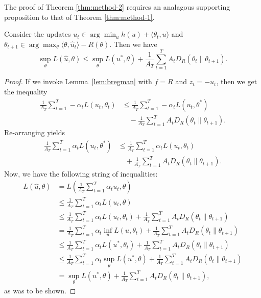 \documentclass{article} %
\begin{document}
The proof of Theorem \ref{thm:method-2} requires an analagous supporting proposition to that of Theorem \ref{thm:method-1}.
\begin{proposition}
\label{prop:method-2}
Consider the updates $u_t \in \arg\min_{u} h(u) + \langle \theta_t, u \rangle$ 
and $\theta_{t+1} \in \arg\max_{\theta} \langle \theta, \hat{u}_t \rangle - R(\theta)$. 
Then we have 
\begin{equation}
\sup_{\theta} L(\hat{u}, \theta) \leq \sup_{\theta} L(u^*, \theta) + \frac{1}{A_T} \sum_{t=1}^T A_tD_{R}(\theta_t \| \theta_{t+1}).
\end{equation}
\end{proposition}
\begin{proof}
If we invoke Lemma~\ref{lem:bregman} with $f=R$ and $z_t=-u_t$, then we get 
the inequality
\begin{align}
\frac{1}{A_T} \sum_{t=1}^T -\alpha_t L(u_t, \theta_t) 
&\leq \frac{1}{A_T} \sum_{t=1}^T -\alpha_t L(u_t, \theta^*) \\
&\quad - \frac{1}{A_T} \sum_{t=1}^T A_tD_R(\theta_t \| \theta_{t+1}). \nonumber
\end{align}
Re-arranging yields
\begin{align}
\frac{1}{A_T }\sum_{t=1}^T \alpha_t L(u_t, \theta^*) 
&\leq \frac{1}{A_T} \sum_{t=1}^T \alpha_t L(u_t, \theta_t) \\
&\quad+ \frac{1}{A_T} \sum_{t=1}^T A_tD_R(\theta_t \| \theta_{t+1}). 
\end{align}
Now, we have the following string of inequalities:
\begin{align*} 
L(\hat{u}, \theta) &= L\left(\frac{1}{A_T} \sum_{t=1}^T \alpha_t u_t, \theta\right) \\
 &\leq \frac{1}{A_T} \sum_{t=1}^T \alpha_t L(u_t, \theta) \\
 &\leq \frac{1}{A_T} \sum_{t=1}^T \alpha_t L(u_t, \theta_t) + \frac{1}{A_T} \sum_{t=1}^T A_t D_R(\theta_t \| \theta_{t+1}) \\
 &= \frac{1}{A_T} \sum_{t=1}^T \alpha_t \inf_{u} L(u, \theta_t) + \frac{1}{A_T} \sum_{t=1}^T A_tD_R(\theta_t \| \theta_{t+1}) \\
 &\leq \frac{1}{A_T} \sum_{t=1}^T \alpha_t L(u^*, \theta_t) + \frac{1}{A_T} \sum_{t=1}^T A_tD_R(\theta_t \| \theta_{t+1}) \\
 &\leq \frac{1}{A_T} \sum_{t=1}^T \alpha_t \sup_{\theta} L(u^*, \theta) + \frac{1}{A_T} \sum_{t=1}^T A_tD_R(\theta_t \| \theta_{t+1}) \\
 &= \sup_{\theta} L(u^*, \theta) + \frac{1}{A_T} \sum_{t=1}^T A_tD_R(\theta_t \| \theta_{t+1}),
\end{align*}
as was to be shown.
\end{proof}
\end{document}
